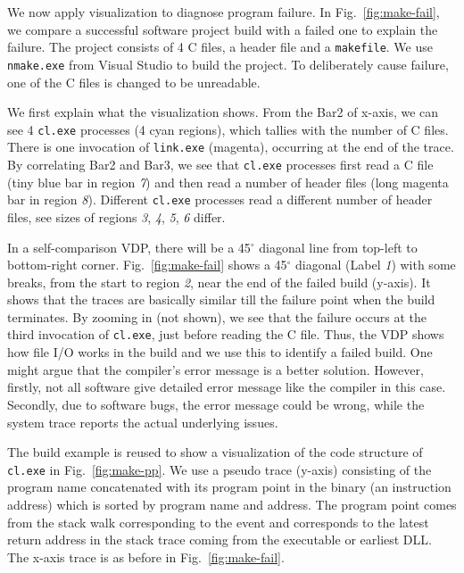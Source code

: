 We now apply visualization to diagnose program failure.
In Fig.~\ref{fig:make-fail}, we compare a successful software project build
with a failed one to explain the failure.
The project consists of 4 C files, a header file and a {\tt makefile}.
We use {\tt nmake.exe} from Visual Studio to build the project.
To deliberately cause failure, one of the C files is changed
to be unreadable.

We first explain what the visualization shows.
From the Bar2 of x-axis, 
we can see 4 {\tt cl.exe} processes (4 cyan regions), which tallies
with the number of C files.
There is one invocation of {\tt link.exe} (magenta),
occurring at the end of the trace.
By correlating Bar2 and Bar3, we see that
{\tt cl.exe} processes first read a C file (tiny blue bar in region {\em 7})
and then read a number of header files (long magenta bar in region {\em 8}).
Different {\tt cl.exe} processes read a different number of header files,
see sizes of regions {\em 3}, {\em 4}, {\em 5}, {\em 6} differ.

In a self-comparison VDP, there will be a 45$^\circ$
diagonal line from top-left to bottom-right corner.
Fig.~\ref{fig:make-fail} shows a 45$^\circ$ diagonal (Label {\em 1})
with some breaks, from
the start to region {\em 2}, near the end of the failed build (y-axis).
It shows that the traces are basically similar till the failure point
when the build terminates.
By zooming in (not shown),
we see that the failure occurs at the third invocation of
{\tt cl.exe}, just before reading the C file.
Thus, the VDP shows how file I/O works in the build and we use this
to identify a failed build.
One might argue that the compiler's error message is a better solution.
However, firstly,
not all software give detailed error message like the compiler in this case.
Secondly, due to software bugs, the error message could be wrong, while 
the system trace reports the actual underlying issues.

The build example is reused to show a visualization of the code structure
of {\tt cl.exe} in Fig.~\ref{fig:make-pp}.
We use a pseudo trace (y-axis) consisting of the program name
concatenated with its program point in the binary (an instruction address)
which is sorted by program name and address.
The program point comes from the stack walk corresponding to the event
and corresponds to the latest return address in the stack trace
coming from the executable or earliest DLL.
The x-axis trace is as before in Fig.~\ref{fig:make-fail}.

